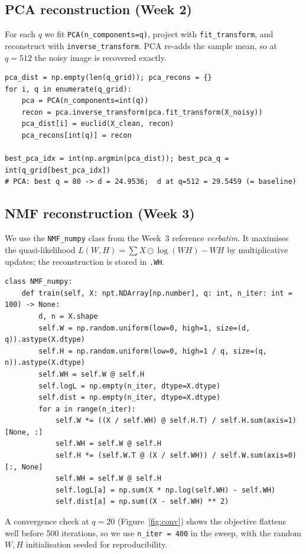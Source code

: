 \documentclass[10pt,a4paper]{article}
\begin{document}
\subsection{PCA reconstruction (Week 2)}

For each $q$ we fit \texttt{PCA(n\_components=q)}, project with \texttt{fit\_transform}, and reconstruct with \texttt{inverse\_transform}. PCA re-adds the sample mean, so at $q=512$ the noisy image is recovered exactly.

\begin{lstlisting}
pca_dist = np.empty(len(q_grid)); pca_recons = {}
for i, q in enumerate(q_grid):
    pca = PCA(n_components=int(q))
    recon = pca.inverse_transform(pca.fit_transform(X_noisy))
    pca_dist[i] = euclid(X_clean, recon)
    pca_recons[int(q)] = recon

best_pca_idx = int(np.argmin(pca_dist)); best_pca_q = int(q_grid[best_pca_idx])
# PCA: best q = 80 -> d = 24.9536;  d at q=512 = 29.5459 (= baseline)
\end{lstlisting}

\subsection{NMF reconstruction (Week 3)}

We use the \texttt{NMF\_numpy} class from the Week~3 reference \emph{verbatim}. It maximises the quasi-likelihood $L(W,H)=\sum X\odot\log(WH)-WH$ by multiplicative updates; the reconstruction is stored in \texttt{.WH}.

\begin{lstlisting}
class NMF_numpy:
    def train(self, X: npt.NDArray[np.number], q: int, n_iter: int = 100) -> None:
        d, n = X.shape
        self.W = np.random.uniform(low=0, high=1, size=(d, q)).astype(X.dtype)
        self.H = np.random.uniform(low=0, high=1 / q, size=(q, n)).astype(X.dtype)
        self.WH = self.W @ self.H
        self.logL = np.empty(n_iter, dtype=X.dtype)
        self.dist = np.empty(n_iter, dtype=X.dtype)
        for a in range(n_iter):
            self.W *= ((X / self.WH) @ self.H.T) / self.H.sum(axis=1)[None, :]
            self.WH = self.W @ self.H
            self.H *= (self.W.T @ (X / self.WH)) / self.W.sum(axis=0)[:, None]
            self.WH = self.W @ self.H
            self.logL[a] = np.sum(X * np.log(self.WH) - self.WH)
            self.dist[a] = np.sum((X - self.WH) ** 2)
\end{lstlisting}

A convergence check at $q=20$ (Figure~\ref{fig:conv}) shows the objective flattens well before 500 iterations, so we use \texttt{n\_iter\,=\,400} in the sweep, with the random $W,H$ initialisation seeded for reproducibility.
\end{document}
